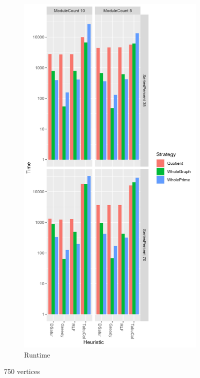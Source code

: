 \documentclass[a4paper]{article}
\begin{document}
\begin{figure}
\begin{subfigure}{.5\paperwidth}
    \end{subfigure}%
    \begin{subfigure}{.5\paperwidth}
        \includegraphics[width=\columnwidth]{Tables/750Time.png}
      \caption{Runtime}
      \label{fig:750t}
    \end{subfigure}
\caption{750 vertices}
\label{fig:750}
\end{figure}
\end{document}
